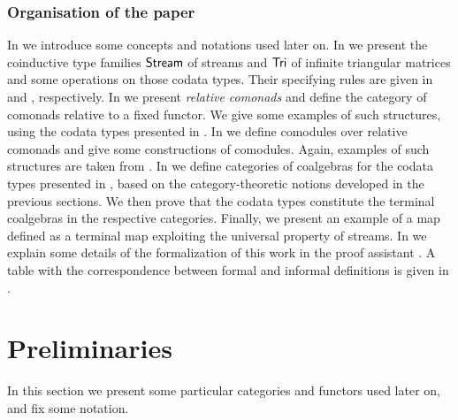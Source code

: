 \documentclass[envcountsame]{llncs}
\begin{document}
\begin{Long}
 
 \subsubsection*{Organisation of the paper}
  In  we introduce some concepts and notations used later on.
  In  we present the coinductive type families $\mathsf{Stream}$ of streams and $\mathsf{Tri}$ of infinite triangular matrices and some operations on those codata types.
   Their specifying rules are given in  and , respectively.
  In  we present \emph{relative comonads} and define the category of comonads relative to a fixed functor.
    We give some examples of such structures, using the codata types presented in .
  In  we define comodules over relative comonads and give some constructions of comodules.
     Again, examples of such structures are taken from .
  In  we define categories of coalgebras for the codata types presented in ,
      based on the category-theoretic notions developed in the previous sections.
      We then prove that the codata types constitute the terminal coalgebras in the respective categories.
      Finally, we present an example of a map defined as a terminal map exploiting the universal property of streams.
  In  we explain some details of the formalization of this work in the proof assistant \coq.
  A table with the correspondence between formal and informal definitions is given in .

\end{Long}


\section{Preliminaries}\label{sec:preliminaries}

In this section we present some particular categories and functors used later on, and fix some notation.
\end{document}
